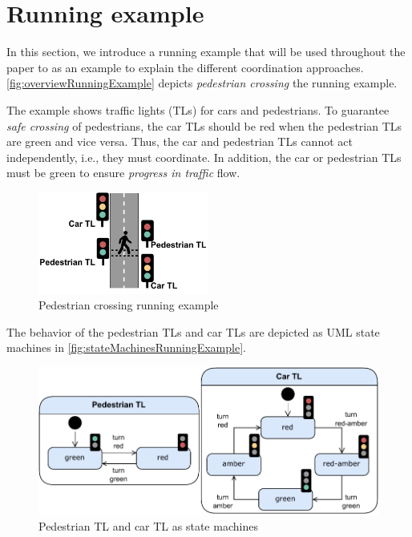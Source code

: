 \documentclass[runningheads]{llncs}
\begin{document}


\section{Running example}
In this section, we introduce a running example that will be used throughout the paper to as an example to explain the different coordination approaches.
\autoref{fig:overviewRunningExample} depicts \textit{pedestrian crossing} the running example.

The example shows traffic lights (TLs) for cars and pedestrians.
To guarantee \textit{safe crossing} of pedestrians, the car TLs should be red when the pedestrian TLs are green and vice versa.
Thus, the car and pedestrian TLs cannot act independently, i.e., they must coordinate.
In addition, the car or pedestrian TLs must be green to ensure \textit{progress in traffic} flow.

\begin{figure}[ht]
	\centering
	\includegraphics[width=0.5\textwidth]{images/running_example_schematic}
	\caption{Pedestrian crossing running example}
	\label{fig:overviewRunningExample}
\end{figure}

The behavior of the pedestrian TLs and car TLs are depicted as UML state machines \cite{objectmanagementgroupUnifiedModelingLanguage2017} in \autoref{fig:stateMachinesRunningExample}.

\begin{figure}[ht]
	\centering
	\includegraphics[width=1\textwidth]{images/running_example_models}
	\caption{Pedestrian TL and car TL as state machines}
	\label{fig:stateMachinesRunningExample}
\end{figure}
\end{document}
